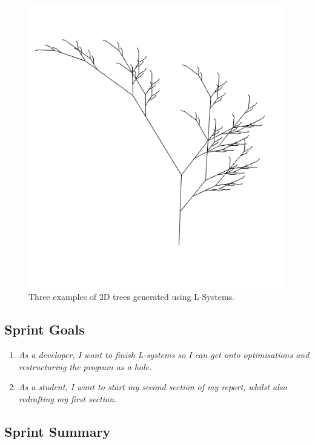 \documentclass[a4paper,10pt]{report}
\begin{document}
\begin{figure}[h!]
\begin{minipage}{.3\textwidth}
\end{minipage}
\begin{minipage}{.3\textwidth}
  \centering
  \includegraphics[width=.9\linewidth]{Images/Sprint-Images/tree3.png}
\end{minipage}
\caption{Three examples of 2D trees generated using L-Systems.}
 \label{fig:sprint8}

\end{figure}

\subsection{Sprint Goals}

\begin{enumerate}
\item \textit{As a developer, I want to finish L-systems so I can get onto optimisations and restructuring the program as a hole.}

\item \textit{As a student, I want to start my second section of my report, whilst also redrafting my first section.}
\end{enumerate}

\subsection{Sprint Summary}
\end{document}
